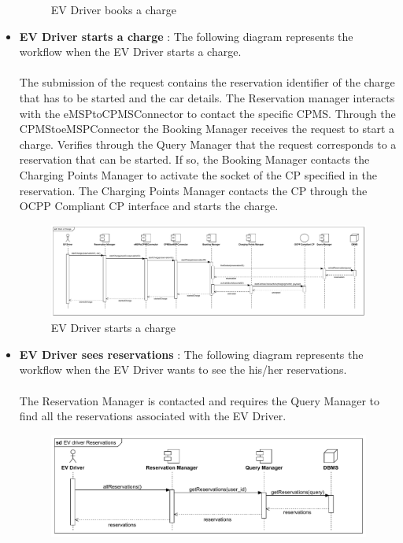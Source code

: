 \begin{itemize}
\begin{figure}[H]
              \caption{EV Driver books a charge}
          \end{figure}
          \pagebreak
    \item \textbf{EV Driver starts a charge} : The following diagram represents the workflow when the EV Driver starts a charge.\\
          \\The submission of the request contains the reservation identifier of the charge that has to be started and the car details.
          The Reservation manager interacts with the eMSPtoCPMSConnector to contact the specific CPMS. Through the CPMStoeMSPConnector the
          Booking Manager receives the request to start a charge. Verifies through the Query Manager that the request corresponds to a reservation
          that can be started. If so, the Booking Manager contacts the Charging Points Manager to activate the socket of the CP specified in the reservation.
          The Charging Points Manager contacts the CP through the OCPP Compliant CP interface and starts the charge.
          \begin{figure}[H]
              \centering
              \hspace*{-2cm}
              \includegraphics[scale=0.50]{src/runtimeView/eMSP_StartACharge.pdf}
              \caption{EV Driver starts a charge}
          \end{figure}
    \item \textbf{EV Driver sees reservations} : The following diagram represents the workflow when the EV Driver wants to see the his/her reservations.\\
          \\ The Reservation Manager is contacted and requires the Query Manager to find all the reservations associated with the EV Driver.
          \begin{figure}[H]
              \centering
              \includegraphics[scale=0.55]{src/runtimeView/eMSP_Reservations.pdf}

\end{figure}
\end{itemize}
